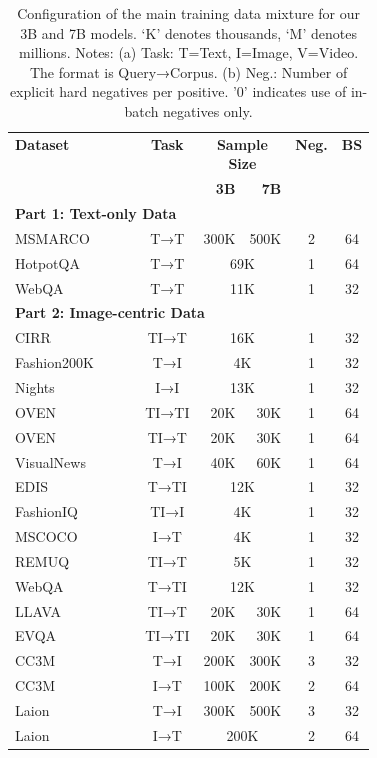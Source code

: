 \begin{table}[t]
\centering
\caption{Configuration of the main training data mixture for our 3B and 7B models. `K' denotes thousands, `M' denotes millions. Notes: (a) Task: T=Text, I=Image, V=Video. The format is Query→Corpus. (b) Neg.: Number of explicit hard negatives per positive. '0' indicates use of in-batch negatives only.}
\label{gve:tab:main_training_data}
\footnotesize
\begin{tabular}{@{}p{0.42\linewidth}crrcc@{}}
\toprule
\textbf{Dataset} & \textbf{Task} & \multicolumn{2}{c}{\textbf{Sample Size}} & \textbf{Neg.} & \textbf{BS} \\
\cmidrule(lr){3-4}
& & \textbf{3B} & \textbf{7B} & & \\
\midrule
\multicolumn{6}{l}{\textbf{Part 1: Text-only Data}} \\
MSMARCO & T→T & 300K & 500K & 2 & 64 \\
HotpotQA & T→T & \multicolumn{2}{c}{69K} & 1 & 64 \\
WebQA & T→T & \multicolumn{2}{c}{11K} & 1 & 32 \\
\midrule
\multicolumn{6}{l}{\textbf{Part 2: Image-centric Data}} \\
CIRR & TI→T & \multicolumn{2}{c}{16K} & 1 & 32 \\
Fashion200K & T→I & \multicolumn{2}{c}{4K} & 1 & 32 \\
Nights & I→I & \multicolumn{2}{c}{13K} & 1 & 32 \\
OVEN & TI→TI & 20K & 30K & 1 & 64 \\
OVEN & TI→T & 20K & 30K & 1 & 64 \\
VisualNews & T→I & 40K & 60K & 1 & 64 \\
EDIS & T→TI & \multicolumn{2}{c}{12K} & 1 & 32 \\
FashionIQ & TI→I & \multicolumn{2}{c}{4K} & 1 & 32 \\
MSCOCO & I→T & \multicolumn{2}{c}{4K} & 1 & 32 \\
REMUQ & TI→T & \multicolumn{2}{c}{5K} & 1 & 32 \\
WebQA & T→TI & \multicolumn{2}{c}{12K} & 1 & 32 \\
LLAVA & TI→T & 20K & 30K & 1 & 64 \\
EVQA & TI→TI & 20K & 30K & 1 & 64 \\
CC3M & T→I & 200K & 300K & 3 & 32 \\
CC3M & I→T & 100K & 200K & 2 & 64 \\
Laion & T→I & 300K & 500K & 3 & 32 \\
Laion & I→T & \multicolumn{2}{c}{200K} & 2 & 64 \\

\end{tabular}
\end{table}
